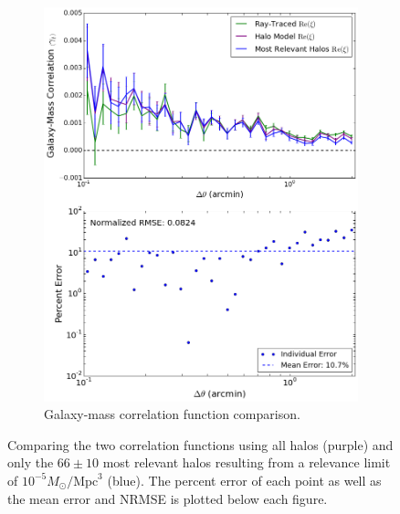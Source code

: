 \documentclass[%
 reprint,
 amsmath,amssymb,
 aps,nofootinbib
]{revtex4-1}
\begin{document}
\begin{figure}
\begin{subfigure}{0.475\textwidth}
        \includegraphics[width=\textwidth]{figs-swe/thesis/rel_ng_compare.png}
        \caption{Galaxy-mass correlation function comparison.}
        \label{fig:rel_ng_compare}
    \end{subfigure}
    \captionsetup{justification=raggedright,singlelinecheck=false}
    \caption{Comparing the two correlation functions using all halos (purple) and only the $66\pm10$ most relevant halos resulting from a relevance limit of ${10^{-5} M_{\odot}/\text{Mpc}^3}$ (blue). The percent error of each point as well as the mean error and NRMSE is plotted below each figure.}
    \label{fig:rel_corr}
\end{figure}

\end{document}

